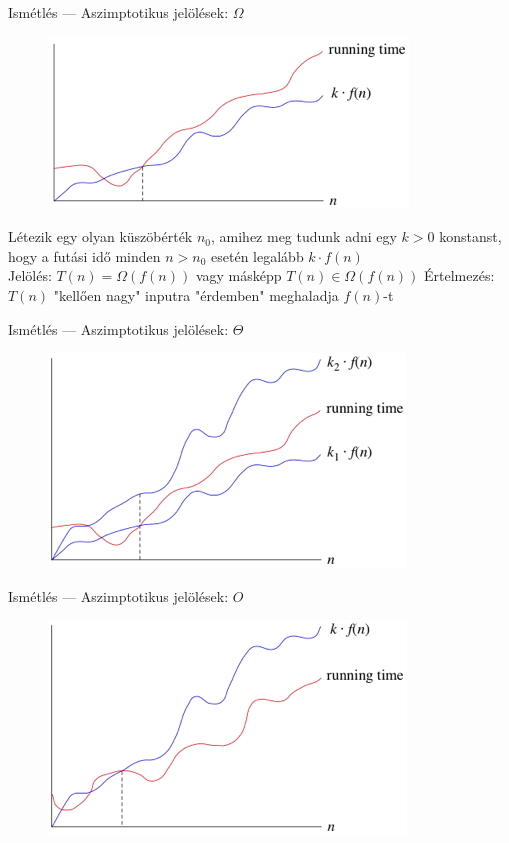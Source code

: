 \documentclass{beamer}
\begin{document}
\begin{frame}{Ismétlés --- Aszimptotikus jelölések: $\Omega$}
\begin{figure}
	\centering
	\includegraphics{Omega_fn}
\end{figure}
Létezik egy olyan küszöbérték $n_0$, amihez meg tudunk adni egy $k>0$ 
konstanst, hogy a futási idő minden $n>n_0$ esetén legalább $k \cdot f(n)$ \\
Jelölés: $T(n) = \Omega(f(n))$ vagy másképp $T(n) \in \Omega(f(n))$
\pause Értelmezés: $T(n)$ "kellően nagy" inputra "érdemben" meghaladja $f(n)$-t
\end{frame}

\begin{frame}{Ismétlés --- Aszimptotikus jelölések: $\Theta$}
\begin{figure}
	\centering
	\includegraphics{Theta_fn}
\end{figure}
\end{frame}

\begin{frame}{Ismétlés --- Aszimptotikus jelölések: $O$}
\begin{figure}
	\centering
	\includegraphics{O_fn}
\end{figure}
\end{frame}
\end{document}
